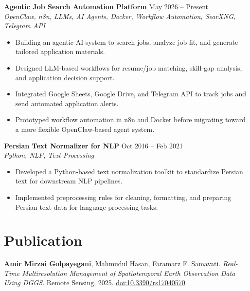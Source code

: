 \documentclass[a4paper,10pt]{article}
\newcommand{\resumeSubheading}[4]{
    \textbf{#1} \hfill #2 \\
    \textit{#3} \hfill \textit{#4}
}
\begin{document}
\noindent
\textbf{Agentic Job Search Automation Platform} \hfill May 2026 -- Present \\
\textit{OpenClaw, n8n, LLMs, AI Agents, Docker, Workflow Automation, SearXNG, Telegram API}
\begin{itemize}[leftmargin=0.25in]
    \item Building an agentic AI system to search jobs, analyze job fit, and generate tailored application materials.
    \item Designed LLM-based workflows for resume/job matching, skill-gap analysis, and application decision support.
    \item Integrated Google Sheets, Google Drive, and Telegram API to track jobs and send automated application alerts.
    \item Prototyped workflow automation in n8n and Docker before migrating toward a more flexible OpenClaw-based agent system.
\end{itemize}

\noindent
\textbf{Persian Text Normalizer for NLP} \hfill Oct 2016 -- Feb 2021 \\
\textit{Python, NLP, Text Processing}
\begin{itemize}[leftmargin=0.25in]
    \item Developed a Python-based text normalization toolkit to standardize Persian text for downstream NLP pipelines.
    \item Implemented preprocessing rules for cleaning, formatting, and preparing Persian text data for language-processing tasks.
\end{itemize}

\section*{Publication}

\textbf{Amir Mirzai Golpayegani}, Mahmudul Hasan, Faramarz F. Samavati. 
\textit{Real-Time Multiresolution Management of Spatiotemporal Earth Observation Data Using DGGS}. 
Remote Sensing, 2025. \href{https://doi.org/10.3390/rs17040570}{doi:10.3390/rs17040570}



\end{document}
